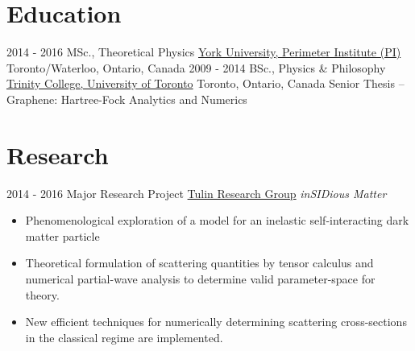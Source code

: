 \documentclass[letterpaper]{twentysecondcv} %
\begin{document}
\makeprofile %

\section{Education}

\begin{twenty} %
	\twentyitem
    	{2014 - 2016}
        {MSc., Theoretical Physics}
        {\href{http://www.yorku.ca/}{York University, Perimeter Institute (PI)}}
        {Toronto/Waterloo, Ontario, Canada}
        {}
	\twentyitem
    	{2009 - 2014}
        {BSc., Physics \& Philosophy}
        {\href{https://www.utoronto.ca/}{Trinity College, University of Toronto}}
        {Toronto, Ontario, Canada}
        {Senior Thesis -- Graphene: Hartree-Fock Analytics and Numerics}
\end{twenty}


\section{Research}
\begin{twenty}
	\twentyitem
    	{2014 - 2016}
        {Major Research Project}
        {\href{http://www.yorku.ca/stulin/research.html}{Tulin Research Group}}
        {\emph{inSIDious Matter}}
        {
        {\begin{itemize}
        \item Phenomenological exploration of a model for an inelastic self-interacting dark matter particle
        \item Theoretical formulation of scattering quantities by tensor calculus and numerical partial-wave analysis to determine valid parameter-space for theory.
       	\item New efficient techniques for numerically determining scattering cross-sections in the classical regime are implemented.
    \end{itemize}}
        }
\end{twenty}

\end{document}
